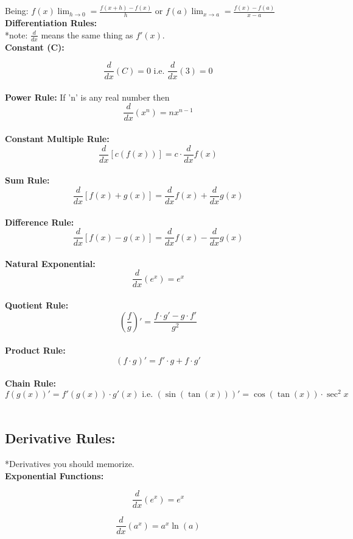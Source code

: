 \documentclass[fleqn]{article}
\begin{document}
Being: $\displaystyle f(x)\lim_{h\to 0} = \frac{f(x+h)-f(x)}{h}$ or $\displaystyle f(a)\lim_{x\to a} = \frac{f(x)-f(a)}{x-a}$
\newline
\\

\textbf{Differentiation Rules:}
\\

*note: $\frac{d}{dx}$ means the same thing as $f'(x)$.
\\

\textbf{Constant (C):} 

\[\frac{d}{dx}(C) = 0 \text{ i.e. } \frac{d}{dx}(3) = 0\]
\\

\textbf{Power Rule:} If 'n' is any real number then 
\[\frac{d}{dx}(x^n) = nx^{n-1}\]
\\

\textbf{Constant Multiple Rule:} 
\[\frac{d}{dx}[c(f(x))] = c \cdot\frac{d}{dx}f(x)\]
\\

\textbf{Sum Rule:} 
\[\frac{d}{dx}[f(x) + g(x)] = \frac{d}{dx}f(x) + \frac{d}{dx}g(x)\]
\\

\textbf{Difference Rule:} 
\[\frac{d}{dx}[f(x) - g(x)] = \frac{d}{dx}f(x) - \frac{d}{dx}g(x)\]
\\

\textbf{Natural Exponential:} 
\[\frac{d}{dx}(e^x) = e^x\]
\\

\textbf{Quotient Rule:} 
\[(\frac{f}{g})' = \frac{f\cdot g' - g \cdot f'}{g^2}\]
\\

\textbf{Product Rule:}
\[(f \cdot g)' = f' \cdot g + f \cdot g'\] 
\\

\textbf{Chain Rule:} 
\[f(g(x))' = f'(g(x))\cdot g'(x) \text{ i.e. } (\sin(\tan(x)))' = \cos(\tan(x)) \cdot \sec^2x\]
\\

\subsection*{Derivative Rules:}
*Derivatives you should memorize.
\\


\textbf{Exponential Functions:}

\[\frac{d}{dx}(e^x) = e^x\]

\[\frac{d}{dx}(a^x) = a^x\ln(a)\]
\end{document}
